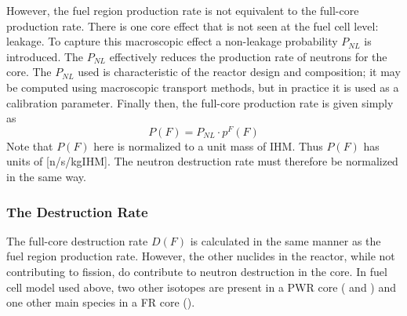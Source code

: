 However, the fuel region production rate is not equivalent to the full-core production rate.  There is one 
core effect that is not seen at the fuel cell level: leakage.  To capture this macroscopic effect a 
non-leakage probability $P_{NL}$ is introduced.  The $P_{NL}$ effectively reduces the production rate of 
neutrons for the core. The $P_{NL}$ used is characteristic of the reactor design and composition; it may 
be computed using macroscopic transport methods, but in practice it is used as a calibration parameter.  
Finally then, the full-core production rate is given simply as 
\begin{equation}
\label{1g_P_F}
P(F) = P_{NL} \cdot p^F(F)
\end{equation}
Note that $P(F)$ here is normalized to a unit mass of IHM.  Thus $P(F)$ has units of [n/s/kgIHM].
The neutron destruction rate must therefore be normalized in the same way.



\subsubsection{The Destruction Rate}
\label{1g_sec:d_rate}
The full-core destruction rate $D(F)$ is calculated in the same manner as the fuel 
region production rate.  However, the other nuclides in the reactor, while not contributing 
to fission, do contribute to neutron destruction in the core.  In fuel cell model used above, 
two other isotopes are present in a PWR core ( and ) and one other main species 
in a FR core ().

